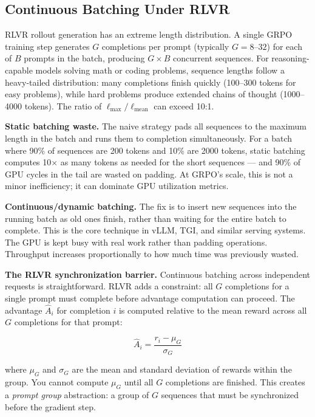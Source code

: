 \subsection{Continuous Batching Under RLVR}

RLVR rollout generation has an extreme length distribution. A single GRPO training step generates $G$ completions per prompt (typically $G = 8$--$32$) for each of $B$ prompts in the batch, producing $G \times B$ concurrent sequences. For reasoning-capable models solving math or coding problems, sequence lengths follow a heavy-tailed distribution: many completions finish quickly (100--300 tokens for easy problems), while hard problems produce extended chains of thought (1000--4000 tokens). The ratio of $\ell_\text{max} / \ell_\text{mean}$ can exceed 10:1.

\textbf{Static batching waste.} The naive strategy pads all sequences to the maximum length in the batch and runs them to completion simultaneously. For a batch where 90\% of sequences are 200 tokens and 10\% are 2000 tokens, static batching computes 10$\times$ as many tokens as needed for the short sequences --- and 90\% of GPU cycles in the tail are wasted on padding. At GRPO's scale, this is not a minor inefficiency; it can dominate GPU utilization metrics.

\textbf{Continuous/dynamic batching.} The fix is to insert new sequences into the running batch as old ones finish, rather than waiting for the entire batch to complete. This is the core technique in vLLM, TGI, and similar serving systems. The GPU is kept busy with real work rather than padding operations. Throughput increases proportionally to how much time was previously wasted.

\textbf{The RLVR synchronization barrier.} Continuous batching across independent requests is straightforward. RLVR adds a constraint: all $G$ completions for a single prompt must complete before advantage computation can proceed. The advantage $\hat{A}_i$ for completion $i$ is computed relative to the mean reward across all $G$ completions for that prompt:

$$\hat{A}_i = \frac{r_i - \mu_G}{\sigma_G}$$

where $\mu_G$ and $\sigma_G$ are the mean and standard deviation of rewards within the group. You cannot compute $\mu_G$ until all $G$ completions are finished. This creates a \textit{prompt group} abstraction: a group of $G$ sequences that must be synchronized before the gradient step.

